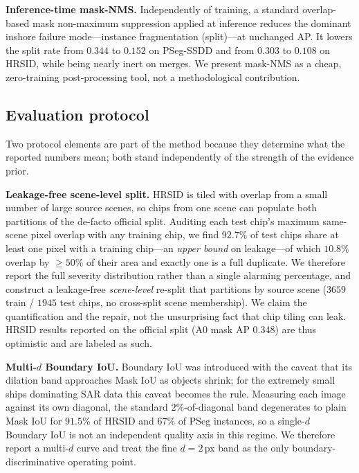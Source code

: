 \documentclass[journal]{IEEEtran}
\begin{document}
\textbf{Inference-time mask-NMS.} Independently of training, a standard overlap-based mask non-maximum suppression applied at inference reduces the dominant inshore failure mode---instance fragmentation (split)---at unchanged AP. It lowers the split rate from $0.344$ to $0.152$ on PSeg-SSDD and from $0.303$ to $0.108$ on HRSID, while being nearly inert on merges. We present mask-NMS as a cheap, zero-training post-processing tool, not a methodological contribution.

\subsection{Evaluation protocol}
\label{sec:protocol}
Two protocol elements are part of the method because they determine what the reported numbers mean; both stand independently of the strength of the evidence prior.

\textbf{Leakage-free scene-level split.} HRSID \cite{wei2020hrsid} is tiled with overlap from a small number of large source scenes, so chips from one scene can populate both partitions of the de-facto official split. Auditing each test chip's maximum same-scene pixel overlap with any training chip, we find $92.7\%$ of test chips share at least one pixel with a training chip---an \emph{upper bound} on leakage---of which $10.8\%$ overlap by $\ge\!50\%$ of their area and exactly one is a full duplicate. We therefore report the full severity distribution rather than a single alarming percentage, and construct a leakage-free \emph{scene-level} re-split that partitions by source scene ($3659$ train / $1945$ test chips, no cross-split scene membership). We claim the quantification and the repair, not the unsurprising fact that chip tiling can leak. HRSID results reported on the official split (A0 mask AP $0.348$) are thus optimistic and are labeled as such.

\textbf{Multi-$d$ Boundary IoU.} Boundary IoU \cite{cheng2021boundary} was introduced with the caveat that its dilation band approaches Mask IoU as objects shrink; for the extremely small ships dominating SAR data this caveat becomes the rule. Measuring each image against its own diagonal, the standard $2\%$-of-diagonal band degenerates to plain Mask IoU for $91.5\%$ of HRSID and $67\%$ of PSeg instances, so a single-$d$ Boundary IoU is not an independent quality axis in this regime. We therefore report a multi-$d$ curve and treat the fine $d\!=\!2$\,px band as the only boundary-discriminative operating point.
\end{document}
